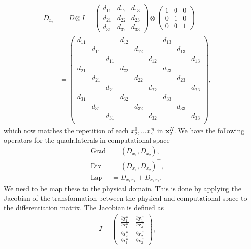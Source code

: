 \documentclass[11pt, a4paper]{article}
\theoremstyle{definition}
\DeclareMathOperator{\Grad}{Grad}
\DeclareMathOperator{\Div}{Div}
\DeclareMathOperator{\Lap}{Lap}
\begin{document}
\begin{align*}
	D_{x_2}&=D \otimes I = 
	\begin{pmatrix}
		d_{11} & d_{12} & d_{13}\\
		d_{21} & d_{22} & d_{23} \\
		d_{31} & d_{32} & d_{33}
	\end{pmatrix}
	\otimes
	\begin{pmatrix}
		1 & 0 & 0\\
		0 & 1 & 0 \\
		0 & 0 & 1
	\end{pmatrix}
	\\&=
	\begin{pmatrix}
		d_{11} & & & d_{12} & & & d_{13} & & \\
		& d_{11} & & & d_{12} & & &  d_{13} & \\
		& & d_{11} & & &  d_{12} &  & & d_{13}\\
		d_{21} & & & d_{22} & & & d_{23} & & \\
		& d_{21} & & & d_{22} & & &  d_{23} & \\
		& & d_{21} & & &  d_{22} &  & & d_{23}\\
		d_{31} & & & d_{32} & & & d_{33} & & \\
		& d_{31} & & & d_{32} & & &  d_{33} & \\
		& & d_{31} & & &  d_{32} &  & & d_{33}\\
	\end{pmatrix},
\end{align*}
which now matches the repetition of each $x_2^0,...x_2^m$ in $\mathbf{x}_2^{K}$.
We have the following operators for the quadrilaterals in computational space
\begin{align*}
	\Grad &= \left(D_{x_1}, D_{x_2}\right),\\
	\Div &=\left(D_{x_1}, D_{x_2}\right)^\top,\\
	\Lap &= D_{x_1x_1} + D_{x_2x_2}.
\end{align*}
We need to be map these to the physical domain. This is done by applying the Jacobian of the transformation between the physical and computational space to the differentiation matrix.
The Jacobian is defined as
\begin{align*}
	J = \begin{pmatrix}
		\frac{\partial \mathbf{y}_1^{K}}{\partial \mathbf{x}_1^{K}} & \frac{\partial \mathbf{y}_1^{K}}{\partial \mathbf{x}_2^{K}}\\
		\frac{\partial \mathbf{y}_2^{K}}{\partial \mathbf{x}_1^{K}} & \frac{\partial \mathbf{y}_2^{K}}{\partial \mathbf{x}_2^{K}}
	\end{pmatrix},
\end{align*}
\end{document}
